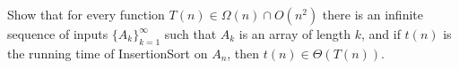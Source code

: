 \documentclass[11pt]{article}
\begin{document}
\begin{enumerate}[leftmargin=*]
Show that for every function $T(n) \in \Omega(n) \cap O(n^2)$
there is an infinite sequence of inputs $\{A_k\}_{k=1}^{\infty}$
such that $A_k$ is an array of length $k$, and if $t(n)$ is the running time of
InsertionSort on $A_n$, then $t(n) \in \Theta(T(n))$.


\end{enumerate}
\end{document}
